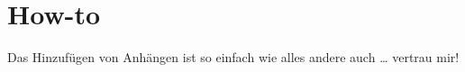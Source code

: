 \chapter{How-to}
    \label{app:how_to}
    
    Das Hinzufügen von Anhängen ist so einfach wie alles andere auch \ldots{} vertrau mir!
